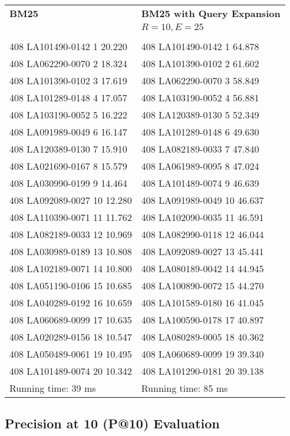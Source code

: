 \begin{tabular}{ l l }
\textbf{BM25} & \textbf{BM25 with Query Expansion}\\
              & $R = 10, E = 25$\\\\
408 LA101490-0142 1 20.220 & 408 LA101490-0142 1 64.878\\
408 LA062290-0070 2 18.324 & 408 LA101390-0102 2 61.602\\
408 LA101390-0102 3 17.619 & 408 LA062290-0070 3 58.849\\
408 LA101289-0148 4 17.057 & 408 LA103190-0052 4 56.881\\
408 LA103190-0052 5 16.222 & 408 LA120389-0130 5 52.349\\
408 LA091989-0049 6 16.147 & 408 LA101289-0148 6 49.630\\
408 LA120389-0130 7 15.910 & 408 LA082189-0033 7 47.840\\
408 LA021690-0167 8 15.579 & 408 LA061989-0095 8 47.024\\
408 LA030990-0199 9 14.464 & 408 LA101489-0074 9 46.639\\
408 LA092089-0027 10 12.280 & 408 LA091989-0049 10 46.637\\
408 LA110390-0071 11 11.762 & 408 LA102090-0035 11 46.591\\
408 LA082189-0033 12 10.969 & 408 LA082990-0118 12 46.044\\
408 LA030989-0189 13 10.808 & 408 LA092089-0027 13 45.441\\
408 LA102189-0071 14 10.800 & 408 LA080189-0042 14 44.945\\
408 LA051190-0106 15 10.685 & 408 LA100890-0072 15 44.270\\
408 LA040289-0192 16 10.659 & 408 LA101589-0180 16 41.045\\
408 LA060689-0099 17 10.635 & 408 LA100590-0178 17 40.897\\
408 LA020289-0156 18 10.547 & 408 LA080289-0005 18 40.362\\
408 LA050489-0061 19 10.495 & 408 LA060689-0099 19 39.340\\
408 LA101489-0074 20 10.342 & 408 LA101290-0181 20 39.138\\
Running time: 39 ms & Running time: 85 ms\\
\end{tabular}

\setlength{\tabcolsep}{5pt}

\newpage
\subsection{Precision at 10 (P@10) Evaluation}

